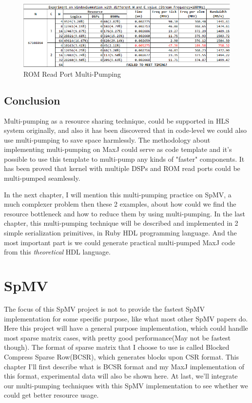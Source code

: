 \documentclass[a4paper, 10pt]{report}
\begin{document}
\begin{figure}[h!]
  \caption{ROM Read Port Multi-Pumping}
  \centering
    \includegraphics[width=1.0\textwidth]{window-summation}
\end{figure}

\section{Conclusion}
Multi-pumping as a resource sharing technique, could be supported in HLS system originally, and also it has been discovered that in code-level we could also use multi-pumping to save space harmlessly. The methodology about implementing multi-pumping on MaxJ could serve as code template and it's possible to use this template to multi-pump any kinds of "faster" components. It has been proved that kernel with multiple DSPs and ROM read ports could be multi-pumped seamlessly.

In the next chapter, I will mention this multi-pumping practice on SpMV, a much complexer problem then these 2 examples, about how could we find the resource bottleneck and how to reduce them by using multi-pumping. In the last chapter, this multi-pumping technique will be described and implemented in 2 simple serialization primitives, in Ruby HDL programming language. And the most important part is we could generate practical multi-pumped MaxJ code from this \textit{theoretical} HDL language.

\chapter{SpMV}
The focus of this SpMV project is not to provide the fastest SpMV implementation for some specific purpose, like what most other SpMV papers do. Here this project will have a general purpose implementation, which could handle most sparse matrix cases, with pretty good performance(May not be fastest though). The format of sparse matrix that I choose to use is called Blocked Compress Sparse Row(BCSR), which generates blocks upon CSR format. This chapter I'll first describe what is BCSR format and my MaxJ implementation of this format, experimental data will also be shown here. At last, we'll integrate our multi-pumping techniques with this SpMV implementation to see whether we could get better resource usage.
\end{document}
